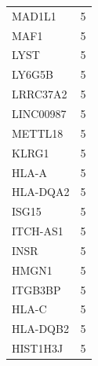 \documentclass[a4paper,12pt]{article}
\begin{document}
\begin{longtable}{ll}
  MAD1L1        & 5                                                                                     \\
  MAF1          & 5                                                                                     \\
  LYST          & 5                                                                                     \\
  LY6G5B        & 5                                                                                     \\
  LRRC37A2      & 5                                                                                     \\
  LINC00987     & 5                                                                                     \\
  METTL18       & 5                                                                                     \\
  KLRG1         & 5                                                                                     \\
  HLA-A         & 5                                                                                     \\
  HLA-DQA2      & 5                                                                                     \\
  ISG15         & 5                                                                                     \\
  ITCH-AS1      & 5                                                                                     \\
  INSR          & 5                                                                                     \\
  HMGN1         & 5                                                                                     \\
  ITGB3BP       & 5                                                                                     \\
  HLA-C         & 5                                                                                     \\
  HLA-DQB2      & 5                                                                                     \\
  HIST1H3J      & 5                                                                                     \\

\end{longtable}
\end{document}
